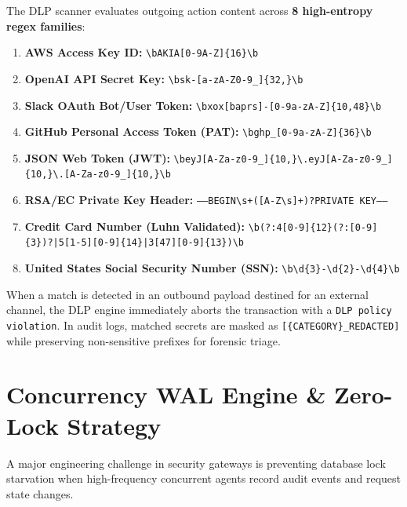 The DLP scanner evaluates outgoing action content across \textbf{8 high-entropy regex families}:
\begin{enumerate}
    \item \textbf{AWS Access Key ID:} \texttt{\textbackslash bAKIA[0-9A-Z]\{16\}\textbackslash b}
    \item \textbf{OpenAI API Secret Key:} \texttt{\textbackslash bsk-[a-zA-Z0-9\_\-]\{32,\}\textbackslash b}
    \item \textbf{Slack OAuth Bot/User Token:} \texttt{\textbackslash bxox[baprs]-[0-9a-zA-Z]\{10,48\}\textbackslash b}
    \item \textbf{GitHub Personal Access Token (PAT):} \texttt{\textbackslash bghp\_[0-9a-zA-Z]\{36\}\textbackslash b}
    \item \textbf{JSON Web Token (JWT):} \texttt{\textbackslash beyJ[A-Za-z0-9\_\-]\{10,\}\textbackslash .eyJ[A-Za-z0-9\_\-]\{10,\}\textbackslash .[A-Za-z0-9\_\-]\{10,\}\textbackslash b}
    \item \textbf{RSA/EC Private Key Header:} \texttt{-----BEGIN\textbackslash s+([A-Z\textbackslash s]+)?PRIVATE KEY-----}
    \item \textbf{Credit Card Number (Luhn Validated):} \texttt{\textbackslash b(?:4[0-9]\{12\}(?:[0-9]\{3\})?|5[1-5][0-9]\{14\}|3[47][0-9]\{13\})\textbackslash b}
    \item \textbf{United States Social Security Number (SSN):} \texttt{\textbackslash b\textbackslash d\{3\}-\textbackslash d\{2\}-\textbackslash d\{4\}\textbackslash b}
\end{enumerate}

When a match is detected in an outbound payload destined for an external channel, the DLP engine immediately aborts the transaction with a \texttt{DLP policy violation}. In audit logs, matched secrets are masked as \texttt{[\{CATEGORY\}\_REDACTED]} while preserving non-sensitive prefixes for forensic triage.

\section{Concurrency WAL Engine \& Zero-Lock Strategy}
A major engineering challenge in security gateways is preventing database lock starvation when high-frequency concurrent agents record audit events and request state changes.

